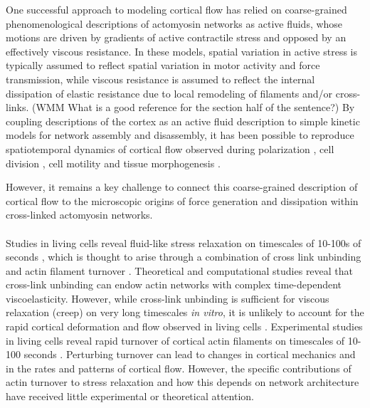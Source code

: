 \documentclass[10pt,letterpaper]{article}
\begin{document}
One successful approach to modeling cortical flow has relied on coarse-grained phenomenological descriptions of actomyosin networks as active fluids, whose motions are driven by gradients of active contractile stress and opposed by an effectively viscous resistance\cite{cellmech_flows}.  In these models, spatial variation in active stress is typically assumed to reflect spatial variation in motor activity and force transmission\cite{PhysRevLett.106.028103}, while viscous resistance is assumed to reflect the internal dissipation of elastic resistance due to local remodeling of filaments and/or cross-links. (WMM  What is a good reference for the section half of the sentence?) By coupling descriptions of the cortex as an active fluid description to simple kinetic models for network assembly and disassembly, it has been possible to reproduce spatiotemporal dynamics of cortical flow observed during polarization \cite{cellmech_flows}, cell division \cite{Turlier2014114,PhysRevLett.103.058102}, cell motility \cite{Keren:2009aa,RevModPhys.85.1143} and tissue morphogenesis \cite{Behrndt257}. 


However, it remains a key challenge to connect this coarse-grained description of cortical flow to the microscopic origins of force generation and dissipation within cross-linked actomyosin networks.  

\paragraph{} Studies in living cells reveal fluid-like stress relaxation on timescales of 10-100s of seconds \cite{cellmech_flows,cellmech_flows2,cellmech_flows3,rheo_fluid,rheo_fluid2,cell_rheo_exp}, which is thought to arise through a combination of cross link unbinding and actin filament turnover \cite{De-La-Cruz:2015aa,De-La-Cruz:2009aa,Salbreux2012536}.  Theoretical \cite{theo_crosslinkslip1,theo_crosslinkslip2} and computational \cite{model_taeyoon,rheo_crosslinkslip2,theo_crosslinkslip3} studies reveal that cross-link unbinding can endow actin networks with complex time-dependent viscoelasticity. However, while cross-link unbinding is sufficient for viscous relaxation (creep) on very long timescales {\em in vitro}, it is unlikely to account for the rapid cortical deformation and flow observed in living cells \cite{rheo_crosslinksmatter,rheo_crosslinkslip1,rheo_crosslinkslip2,rheo_crosslinkslip3,rheo_nonaffine}.  Experimental studies in living cells reveal rapid turnover of cortical actin filaments on timescales of 10-100 seconds \cite{Robin:2014a,Fritzsche:2013aa,Fritzschee1501337,Carlsson:2010aa,Lai:2008aa}.  Perturbing turnover can lead to changes in cortical mechanics and in the rates and patterns of cortical flow\cite{Van-Goor:2012aa,Fritzschee1501337}.  However, the specific contributions of actin turnover to stress relaxation and how this depends on network architecture have received little experimental or theoretical attention.   
\end{document}
